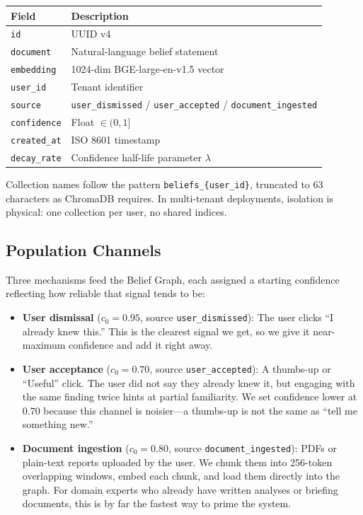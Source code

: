 \documentclass[conference]{IEEEtran}
\begin{document}
\begin{center}
\footnotesize
\begin{tabular}{@{}ll@{}}
  \toprule
  \textbf{Field}   & \textbf{Description} \\
  \midrule
  \texttt{id}         & UUID v4 \\
  \texttt{document}   & Natural-language belief statement \\
  \texttt{embedding}  & 1024-dim BGE-large-en-v1.5 vector \\
  \texttt{user\_id}   & Tenant identifier \\
  \texttt{source}     & \texttt{user\_dismissed} / \texttt{user\_accepted} / \texttt{document\_ingested} \\
  \texttt{confidence} & Float $\in (0, 1]$ \\
  \texttt{created\_at}& ISO 8601 timestamp \\
  \texttt{decay\_rate}& Confidence half-life parameter $\lambda$ \\
  \bottomrule
\end{tabular}
\end{center}

Collection names follow the pattern \texttt{beliefs\_\{user\_id\}},
truncated to 63 characters as ChromaDB requires. In multi-tenant
deployments, isolation is physical: one collection per user, no
shared indices.

\subsection{Population Channels}

Three mechanisms feed the Belief Graph, each assigned a starting
confidence reflecting how reliable that signal tends to be:

\begin{itemize}
  \item \textbf{User dismissal} ($c_0 = 0.95$, source
  \texttt{user\_dismissed}): The user clicks ``I already knew
  this.'' This is the clearest signal we get, so we give it
  near-maximum confidence and add it right away.

  \item \textbf{User acceptance} ($c_0 = 0.70$, source
  \texttt{user\_accepted}): A thumbs-up or ``Useful'' click.
  The user did not say they already knew it, but engaging with
  the same finding twice hints at partial familiarity. We set
  confidence lower at 0.70 because this channel is noisier---a
  thumbs-up is not the same as ``tell me something new.''

  \item \textbf{Document ingestion} ($c_0 = 0.80$, source
  \texttt{document\_ingested}): PDFs or plain-text reports
  uploaded by the user. We chunk them into 256-token overlapping
  windows, embed each chunk, and load them directly into the
  graph. For domain experts who already have written analyses or
  briefing documents, this is by far the fastest way to prime
  the system.
\end{itemize}
\end{document}
